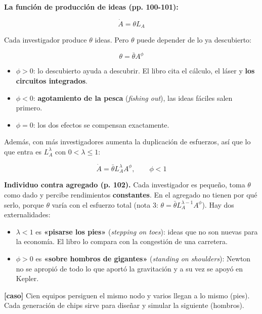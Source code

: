 \documentclass[11pt,a4paper]{article}
\begin{document}
\textbf{La función de producción de ideas (pp. 100-101):}

\begin{equation*}\dot A = \theta L_A \tag{5.2}\end{equation*}

Cada investigador produce $\theta$ ideas. Pero $\theta$ puede depender de lo ya descubierto:

\begin{equation*}\theta = \bar\theta A^\phi \tag{5.3}\end{equation*}

\begin{itemize}[leftmargin=*,itemsep=2pt,topsep=2pt]
\item $\phi > 0$: lo descubierto ayuda a descubrir. El libro cita el cálculo, el láser y \textbf{los circuitos integrados}.
\item $\phi < 0$: \textbf{agotamiento de la pesca} (\emph{fishing out}), las ideas fáciles salen primero.
\item $\phi = 0$: los dos efectos se compensan exactamente.
\end{itemize}

Además, con más investigadores aumenta la duplicación de esfuerzos, así que lo que entra es $L_A^\lambda$ con $0 < \lambda \le 1$:

\begin{equation*}\dot A = \bar\theta L_A^\lambda A^\phi, \qquad \phi < 1 \tag{5.4}\end{equation*}

\textbf{Individuo contra agregado (p. 102).} Cada investigador es pequeño, toma $\theta$ como dado y percibe rendimientos \textbf{constantes}. En el agregado no tienen por qué serlo, porque $\theta$ varía con el esfuerzo total (nota 3: $\theta = \bar\theta L_A^{\lambda-1}A^\phi$). Hay dos externalidades:

\begin{itemize}[leftmargin=*,itemsep=2pt,topsep=2pt]
\item $\lambda < 1$ es \textbf{«pisarse los pies»} (\emph{stepping on toes}): ideas que no son nuevas para la economía. El libro lo compara con la congestión de una carretera.
\item $\phi > 0$ es \textbf{«sobre hombros de gigantes»} (\emph{standing on shoulders}): Newton no se apropió de todo lo que aportó la gravitación y a su vez se apoyó en Kepler.
\end{itemize}

\textbf{[caso]} Cien equipos persiguen el mismo nodo y varios llegan a lo mismo (pies). Cada generación de chips sirve para diseñar y simular la siguiente (hombros).
\end{document}

